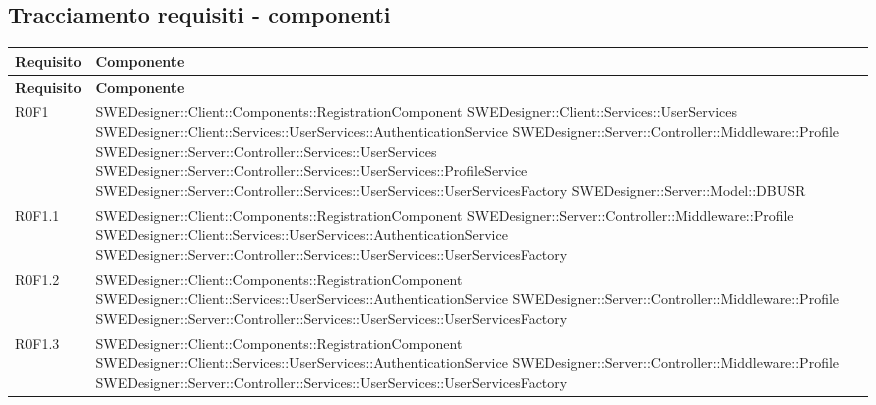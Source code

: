 	\subsection{Tracciamento requisiti - componenti}
	\begin{center}


\begin{longtable}{p{2cm}!{\VRule[1pt]}p{14cm}}
\color{white} \textbf{Requisito} & \color{white} \textbf{Componente}\\ 
\endfirsthead 
{} 
\color{white} \textbf{Requisito} & \color{white} \textbf{Componente}\\  
\endhead 

R0F1 & SWEDesigner::Client::Components::RegistrationComponent \newline SWEDesigner::Client::Services::UserServices \newline SWEDesigner::Client::Services::UserServices::AuthenticationService \newline SWEDesigner::Server::Controller::Middleware::Profile \newline SWEDesigner::Server::Controller::Services::UserServices \newline SWEDesigner::Server::Controller::Services::UserServices::ProfileService \newline SWEDesigner::Server::Controller::Services::UserServices::UserServicesFactory \newline SWEDesigner::Server::Model::DBUSR \\
R0F1.1 & SWEDesigner::Client::Components::RegistrationComponent \newline SWEDesigner::Server::Controller::Middleware::Profile \newline SWEDesigner::Client::Services::UserServices::AuthenticationService \newline SWEDesigner::Server::Controller::Services::UserServices::UserServicesFactory  \\
R0F1.2 & SWEDesigner::Client::Components::RegistrationComponent \newline SWEDesigner::Client::Services::UserServices::AuthenticationService \newline SWEDesigner::Server::Controller::Middleware::Profile \newline SWEDesigner::Server::Controller::Services::UserServices::UserServicesFactory \\
R0F1.3 & SWEDesigner::Client::Components::RegistrationComponent \newline SWEDesigner::Client::Services::UserServices::AuthenticationService \newline SWEDesigner::Server::Controller::Middleware::Profile \newline SWEDesigner::Server::Controller::Services::UserServices::UserServicesFactory \\

\end{longtable}
\end{center}
